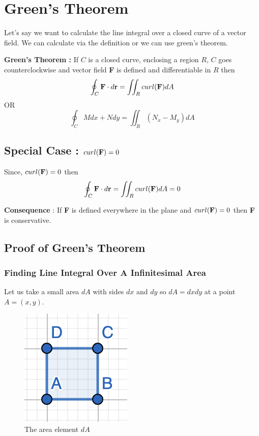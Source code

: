 

\chapter{Green's Theorem}

\bigbreak

Let's say we want to calculate the line integral over a closed curve of a vector field.
We can calculate via the definition or we can use green's theorem.

\begin{mdframed}
\begin{center}
{\bf Green's Theorem : } If $C$ is a closed curve, enclosing a region $R$, $C$ goes counterclockwise 
and vector field {\bf F} is defined and differentiable in $R$ then
$$
\oint_C {\bf F} \cdot d{\bf r} = \iint_R curl({\bf F}) dA
$$
OR
$$
\oint_C Mdx + Ndy = \iint_R (N_x - M_y) dA
$$
\end{center}
\end{mdframed}

\section{Special Case : $curl({\bf F}) = 0$ }

Since, $curl({\bf F}) = 0$ then $$\oint_C {\bf F} \cdot d{\bf r} = \iint_R curl({\bf F}) dA = 0$$

{\bf Consequence} : If {\bf F} is defined everywhere in the plane and $curl({\bf F}) = 0$ then {\bf F} is conservative.

\section{Proof of Green's Theorem}

\subsection{Finding Line Integral Over A Infinitesimal Area}

Let us take a small area $dA$ with sides $dx$ and $dy$ so $dA = dx dy$ at a point $A = (x, y)$.

\begin{figure}[ht!]
    \centering
    \includegraphics[scale=0.8]{./images/lecture_18_figure_1.png}
    \caption{The area element $dA$}
\end{figure}

